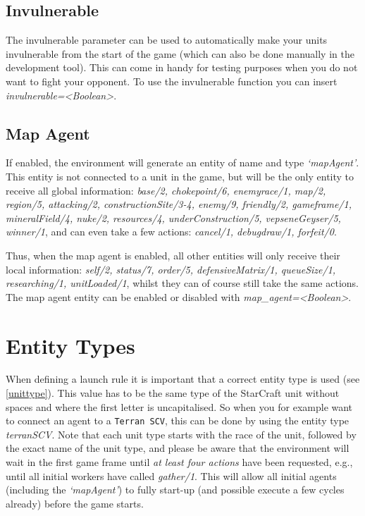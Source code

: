 \subsection{Invulnerable}
\label{invulnerable}
The invulnerable parameter can be used to automatically make your units invulnerable from the start of the game (which can also be done manually in the development tool). This can come in handy for testing purposes when you do not want to fight your opponent. To use the invulnerable function you can insert \textit{invulnerable=<Boolean>}.

\subsection{Map Agent}
\label{map agent}
If enabled, the environment will generate an entity of name and type \textit{`mapAgent'}. This entity is not connected to a unit in the game, but will be the only entity to receive all global information: \textit{base/2, chokepoint/6, enemyrace/1, map/2, region/5, attacking/2, constructionSite/3-4, enemy/9, friendly/2, gameframe/1, mineralField/4, nuke/2, resources/4, underConstruction/5, vepseneGeyser/5, winner/1}, and can even take a few actions: \textit{cancel/1, debugdraw/1, forfeit/0}. 

Thus, when the map agent is enabled, all other entities will only receive their local information: \textit{self/2, status/7, order/5, defensiveMatrix/1, queueSize/1, researching/1, unitLoaded/1}, whilst they can of course still take the same actions. The map agent entity can be enabled or disabled with \textit{map\_agent=<Boolean>}.

\newpage

\section{Entity Types}
When defining a launch rule it is important that a correct entity type is used (see \ref{unittype}). This value has to be the same type of the StarCraft unit without spaces and where the first letter is uncapitalised. So when you for example want to connect an agent to a \texttt{Terran SCV}, this can be done by using the entity type \textit{terranSCV}. Note that each unit type starts with the race of the unit, followed by the exact name of the unit type, and please be aware that the environment will wait in the first game frame until \textit{at least four actions} have been requested, e.g., until all initial workers have called \textit{gather/1}. This will allow all initial agents (including the \textit{`mapAgent'}) to fully start-up (and possible execute a few cycles already) before the game starts.

